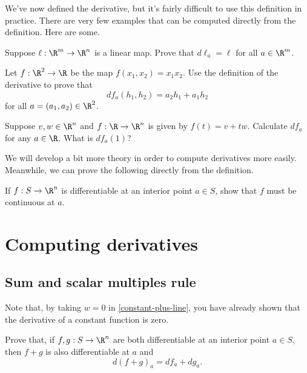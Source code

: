 We've now defined the derivative, but it's fairly difficult to use this definition in practice. There are very few examples that can be computed directly from the definition. Here are some.

\begin{exercise} \label{derivative-of-linear}
	Suppose $\ell : \R^m \to \R^n$ is a linear map. Prove that $d\ell_a = \ell$ for all $a \in \R^m$.  
\end{exercise}

\begin{exercise} \label{derivative-multiplication}
	Let $f : \R^2 \to \R$ be the map $f(x_1,x_2) = x_1x_2$. Use the definition of the derivative to prove that
	\[ df_{a}(h_1, h_2) = a_2h_1 + a_1 h_2 \]
	for all $a = (a_1, a_2) \in \R^2$. 
\end{exercise}

\begin{exercise} \label{constant-plus-line}
	Suppose $v, w \in \R^n$ and $f : \R \to \R^n$ is given by $f(t) = v + tw$. Calculate $df_a$ for any $a \in \R$. What is $df_a(1)$?
\end{exercise}

We will develop a bit more theory in order to compute derivatives more easily. Meanwhile, we can prove the following directly from the definition. 

\begin{exercise} \label{differentiable-implies-continuous}
	If $f : S \to \R^n$ is differentiable at an interior point $a \in S$, show that $f$ must be continuous at $a$. 
\end{exercise}

\section{Computing derivatives}

\subsection{Sum and scalar multiples rule}

Note that, by taking $w = 0$ in \cref{constant-plus-line}, you have already shown that the derivative of a constant function is zero. 

\begin{exercise} \label{sum-rule}
	Prove that, if $f, g : S \to \R^n$ are both differentiable at an interior point $a \in S$, then $f + g$ is also differentiable at $a$ and \[ d(f+g)_a = df_a + dg_a. \]
\end{exercise}

